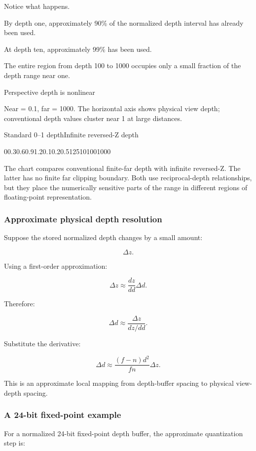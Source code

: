 Notice what happens.

By depth one, approximately 90\% of the normalized depth interval has already been used.

At depth ten, approximately 99\% has been used.

The entire region from depth 100 to 1000 occupies only a small fraction of the depth range near one.

Perspective depth is nonlinear

Near = 0.1, far = 1000. The horizontal axis shows physical view depth; conventional depth values cluster near 1 at large distances.

Standard 0--1 depthInfinite reversed-Z depth

00.30.60.91.20.10.20.5125101001000

The chart compares conventional finite-far depth with infinite reversed-Z. The latter has no finite far clipping boundary. Both use reciprocal-depth relationships, but they place the numerically sensitive parts of the range in different regions of floating-point representation.

\subsubsection{Approximate physical depth resolution}\label{approximate-physical-depth-resolution}

Suppose the stored normalized depth changes by a small amount:

\[
 \Delta z.
\]

Using a first-order approximation:

\[
 \Delta z\approx\frac{dz}{dd}\Delta d.
\]

Therefore:

\[
 \Delta d\approx \frac{\Delta z}{dz/dd}.
\]

Substitute the derivative:

\[
 \boxed{ \Delta d \approx \frac{(f-n)d^2}{fn}\Delta z }.
\]

This is an approximate local mapping from depth-buffer spacing to physical view-depth spacing.

\subsubsection{A 24-bit fixed-point example}\label{a-24-bit-fixed-point-example}

For a normalized 24-bit fixed-point depth buffer, the approximate quantization step is:

